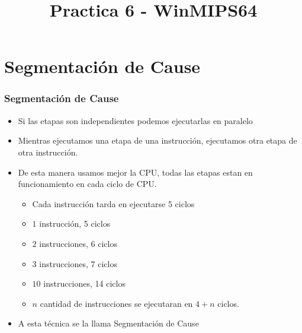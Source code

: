 \documentclass{beamer}
\title{Practica 6 - WinMIPS64}
\begin{document}
\section{Segmentación de Cause}

\begin{frame}
\frametitle{Segmentación de Cause}
\begin{itemize}
\item Si las etapas son independientes podemos ejecutarlas en paralelo
\item Mientras ejecutamos una etapa de una instrucción, ejecutamos otra etapa de otra instrucción.
\item De esta manera usamos mejor la CPU, todas las etapas estan en funcionamiento en cada ciclo de CPU.
\begin{itemize}
  \item Cada instrucción tarda en ejecutarse 5 ciclos
  \item $1$ instrucción, 5 ciclos
  \item $2$ instrucciones, 6 ciclos
  \item $3$ instrucciones, 7 ciclos
  \item $10$ instrucciones, 14 ciclos
  \item $n$ cantidad de instrucciones se ejecutaran en $4 + n$ ciclos.
\end{itemize}
\item A esta técnica se la llama Segmentación de Cause
\end{itemize}
\end{frame}
\end{document}
